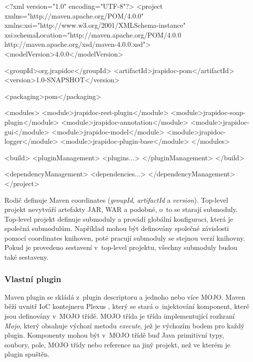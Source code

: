 \documentclass[11pt,twoside,a4paper]{book}
\begin{document}
\begin{code}[frame=single,caption={Ukázka konfigurace multimodulového
projektu}] 
<?xml version="1.0" encoding="UTF-8"?>
<project xmlns="http://maven.apache.org/POM/4.0.0"
         xmlns:xsi="http://www.w3.org/2001/XMLSchema-instance"
         xsi:schemaLocation="http://maven.apache.org/POM/4.0.0
         http://maven.apache.org/xsd/maven-4.0.0.xsd">
    <modelVersion>4.0.0</modelVersion>

    <groupId>org.jrapidoc</groupId>
    <artifactId>jrapidoc-pom</artifactId>
    <version>1.0-SNAPSHOT</version>

    <packaging>pom</packaging>

    <modules>
        <module>jrapidoc-rest-plugin</module>
        <module>jrapidoc-soap-plugin</module>
        <module>jrapidoc-annotation</module>
        <module>jrapidoc-gui</module>
        <module>jrapidoc-model</module>
        <module>jrapidoc-logger</module>
        <module>jrapidoc-plugin-base</module>
    </modules>

    <build>
        <pluginManagement>
            <plugins...>
        </pluginManagement>
    </build>

    <dependencyManagement>
        <dependencies...>
    </dependencyManagement>
</project>
\end{code}

Rodič definuje Maven coordinates ({\em groupId}, {\em artifactId} a {\em
version}).
Top-level projekt nevytváří artefakty JAR, WAR a podobné, o~to se starají submoduly. Top-level projekt definuje
submoduly a provádí globální konfiguraci, která je společná submodulům. Například mohou
být definovány společné závislosti pomocí coordinates knihoven, poté pracují submoduly se
stejnou verzí knihovny. Pokud je provedeno sestavení v~top-level projektu,
všechny submoduly budou také sestaveny.

\subsubsection{Vlastní plugin}

Maven plugin se skládá z~plugin descriptoru a jednoho nebo více MOJO. Maven běží
uvnitř IoC kontejneru Plexus \cite{PlexusHome}, který se stará o~injektování komponent,
které jsou definovány v~MOJO třídě. MOJO třída je třída implementující rozhraní {\em Mojo},
který obsahuje výchozí metodu {\em execute}, jež je výchozím bodem pro každý
plugin.
Komponenty mohou být v~MOJO třídě buď Java primitivní typy, soubory, pole, MOJO
třídy nebo reference na jiný projekt, než ve kterém je plugin spuštěn.
\end{document}
